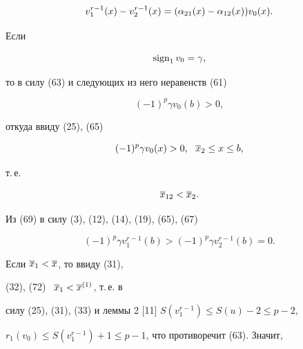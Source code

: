 \begin{pf}
\begin{equation}


v_1^{r-1}(x)-v_2^{r-1}(x)=(\a_{21}(x)-\a_{12}(x))v_0(x).


\end{equation}





Если


\begin{equation}


\sign_1v_0=\gamma,


\end{equation}


то в силу (63) и следующих из него неравенств (61)


\begin{equation}


(-1)^p\gamma v_0(b)>0,


\end{equation}


откуда ввиду (25), (65)


\begin{equation}


(-1)^p\gamma v_0(x)>0,\ \ \o{x}_2\le x\le b,


\end{equation} 


т.\,е.


\begin{equation}


\o{x}_{12}<\o{x}_{2}.


\end{equation}


Из (69) в силу (3), (12), (14), (19), (65), (67)


\begin{equation}


(-1)^p\gamma v_1^{r-1}(b)>(-1)^p\gamma v_2^{r-1}(b)=0.


\end{equation}





Если $\overline{x}_1<\overline{x}$, то ввиду (31),


(32), (72) \ $\overline{x}_1<\overline{x}^{(1)}$, т.\,е. в


силу (25), (31), (33) и леммы 2 [11] $S(v_1^{r-1})\le S(u)-2\le p-2$, 


$r_1(v_0)\le S(v_1^{r-1})+1\le p-1$, что противоречит (63). Значит,


\begin{equation}



\end{equation}
\end{pf}
